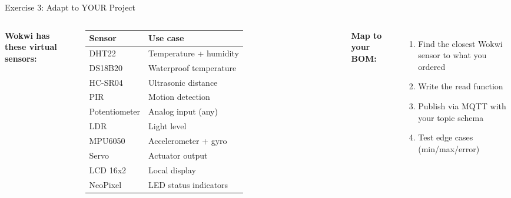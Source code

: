 \documentclass[aspectratio=169,11pt]{beamer}
\begin{document}
\begin{frame}[shrink=5]{Exercise 3: Adapt to YOUR Project}
    \begin{columns}
        \textbf{Wokwi has these virtual sensors:}

        \vspace{0.15cm}
        \footnotesize
        \begin{tabular}{ll}
            \toprule
            \textbf{Sensor} & \textbf{Use case} \\
            \midrule
            DHT22 & Temperature + humidity \\
            DS18B20 & Waterproof temperature \\
            HC-SR04 & Ultrasonic distance \\
            PIR & Motion detection \\
            Potentiometer & Analog input (any) \\
            LDR & Light level \\
            MPU6050 & Accelerometer + gyro \\
            Servo & Actuator output \\
            LCD 16x2 & Local display \\
            NeoPixel & LED status indicators \\
            \bottomrule
        \end{tabular}
        \normalsize

        \textbf{Map to your BOM:}

        \vspace{0.15cm}
        \begin{enumerate}
            \item Find the closest Wokwi sensor to what you ordered
            \item Write the read function
            \item Publish via MQTT with your topic schema
            \item Test edge cases (min/max/error)
        \end{enumerate}

        \vspace{0.15cm}
    \end{columns}
\end{frame}
\end{document}
